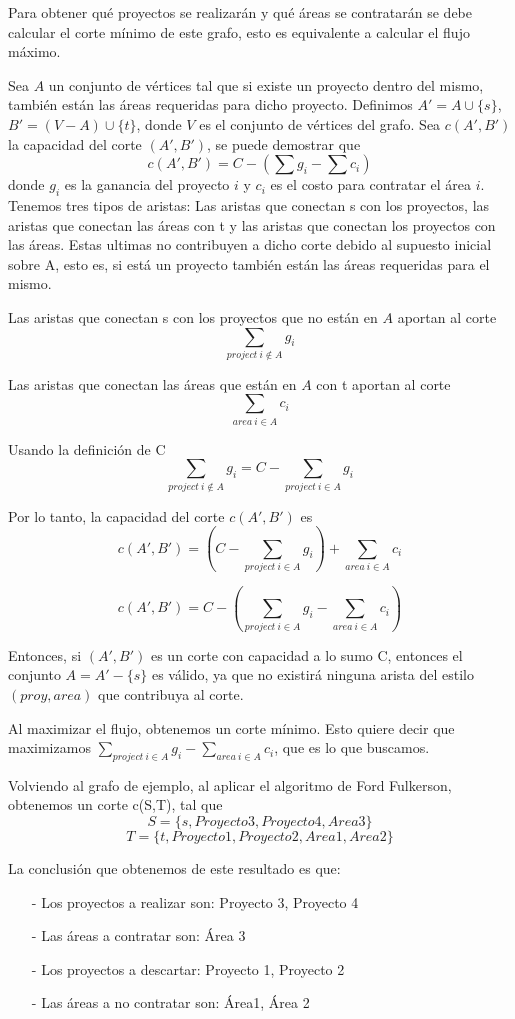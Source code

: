 Para obtener qué proyectos se realizarán y qué áreas se contratarán se debe calcular el corte mínimo de este grafo, esto es equivalente a calcular el flujo máximo. 


Sea $A$ un conjunto de vértices tal que si existe un proyecto dentro del mismo, también están las áreas requeridas para dicho proyecto.
Definimos $A' = A \cup \{s\}$, $B' = (V - A) \cup \{t\}$, donde $V$ es el conjunto de vértices del grafo.
Sea $c(A',B')$ la capacidad del corte $(A',B')$, se puede demostrar que 
$$c(A', B') = C - \left(\sum g_i - \sum c_i\right)$$
donde $g_i$ es la ganancia del proyecto $i$ y $c_i$ es el costo para contratar el área $i$.
Tenemos tres tipos de aristas: Las aristas que conectan s con los proyectos, las aristas que conectan las áreas con t y las aristas que conectan los proyectos con las áreas.
Estas ultimas no contribuyen a dicho corte debido al supuesto inicial sobre A, esto es, si está un proyecto también están las áreas requeridas para el mismo.

Las aristas que conectan s con los proyectos que no están en $A$ aportan al corte
$$ \sum_{project\ i \notin A} g_i $$

Las aristas que conectan las áreas que están en $A$ con t aportan al corte
$$ \sum_{area\ i \in A} c_i $$

Usando la definición de C
$$ \sum_{project\ i \notin A} g_i = C - \sum_{project\ i \in A} g_i$$

Por lo tanto, la capacidad del corte $c(A',B')$ es
$$c(A',B') = \left( C - \sum_{project\ i \in A} g_i \right)+  \sum_{area\ i \in A} c_i $$

$$c(A',B') = C - \left(\sum_{project\ i \in A} g_i - \sum_{area\ i \in A} c_i \right)$$


Entonces, si $(A', B')$ es un corte con capacidad a lo sumo C, entonces el conjunto $A = A' -\{s\}$ es válido, ya que no existirá ninguna arista del estilo $(proy, area)$ que 
contribuya al corte.

Al maximizar el flujo, obtenemos un corte mínimo. Esto quiere decir que maximizamos $\sum_{project\ i \in A} g_i - \sum_{area\ i \in A} c_i$, que es lo que buscamos.



Volviendo al grafo de ejemplo, al aplicar el algoritmo de Ford Fulkerson, obtenemos un corte c(S,T), tal que $$S = \{ s, Proyecto 3, Proyecto 4, Area 3\}$$ 
$$ T = \{ t, Proyecto 1, Proyecto 2, Area 1, Area 2 \}$$

La conclusión que obtenemos de este resultado es que:
\begin{itemize}
 \item[-] Los proyectos a realizar son: Proyecto 3, Proyecto 4
 \item[-] Las áreas a contratar son: Área 3
 \item[-] Los proyectos a descartar: Proyecto 1, Proyecto 2
 \item[-] Las áreas a no contratar son: Área1, Área 2
\end{itemize}

